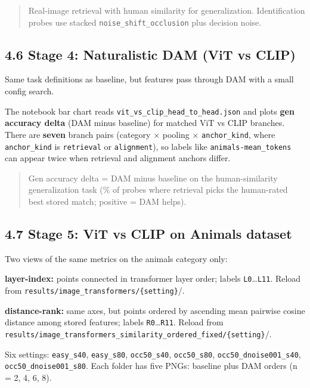 \documentclass[
  11pt,
]{memoir}
\begin{document}
\begin{quote}
Real-image retrieval with human similarity for generalization.
Identification probes use stacked \texttt{noise\_shift\_occlusion} plus
decision noise.
\end{quote}

\subsection{4.6 Stage 4: Naturalistic DAM (ViT vs
CLIP)}\label{stage-4-naturalistic-dam-vit-vs-clip}

Same task definitions as baseline, but features pass through DAM with a
small config search.

The notebook bar chart reads \texttt{vit\_vs\_clip\_head\_to\_head.json}
and plots \textbf{gen accuracy delta} (DAM minus baseline) for matched
ViT vs CLIP branches. There are \textbf{seven} branch pairs (category ×
pooling × \texttt{anchor\_kind}, where \texttt{anchor\_kind} is
\texttt{retrieval} or \texttt{alignment}), so labels like
\texttt{animals-mean\_tokens} can appear twice when retrieval and
alignment anchors differ.

\begin{quote}
Gen accuracy delta = DAM minus baseline on the human-similarity
generalization task (\% of probes where retrieval picks the human-rated
best stored match; positive = DAM helps).
\end{quote}

\subsection{4.7 Stage 5: ViT vs CLIP on Animals
dataset}\label{stage-5-vit-vs-clip-on-animals-dataset}

Two views of the same metrics on the animals category only:

\textbf{layer-index:} points connected in transformer layer order;
labels \texttt{L0}\ldots{}\texttt{L11}. Reload from
{\ttfamily\nolinkurl{results/image\_transformers/\{setting\}}/}.

\textbf{distance-rank:} same axes, but points ordered by ascending mean
pairwise cosine distance among stored features; labels
\texttt{R0}\ldots{}\texttt{R11}. Reload from
{\ttfamily\nolinkurl{results/image\_transformers\_similarity\_ordered\_fixed/\{setting\}}/}.

Six settings: \texttt{easy\_s40}, \texttt{easy\_s80},
\texttt{occ50\_s40}, \texttt{occ50\_s80},
\texttt{occ50\_dnoise001\_s40}, \texttt{occ50\_dnoise001\_s80}. Each
folder has five PNGs: baseline plus DAM orders (n = 2, 4, 6, 8).
\end{document}
